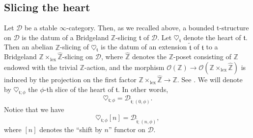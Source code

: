 \documentclass{article}
\theoremstyle{definition}
\newcommand{\Z}{\mathbb{Z}}
\newcommand{\Oo}{\mathcal{O}}
\newcommand{\tee}{\mathfrak{t}}
\begin{document}
\subsection{Slicing the heart}\label{sec:heart}
Let $\mathscr{D}$ be a stable $\infty$-category. Then, as we recalled above, a bounded t-structure on $\mathscr{D}$ is the datum of a Bridgeland $\Z$-slicing $\tee$ of $\mathscr{D}$. Let $\heartsuit_{\mathfrak{t}}$ denote the heart of $\mathfrak{t}$. Then an abelian $\Z$-slicing of $\heartsuit_{\mathfrak{t}}$ is the datum of an extension $\tilde{\tee}$ of $\tee$ to a Bridgeland $\Z\times_{\mathrm{lex}}\hat{\Z}$-slicing on $\mathscr{D}$, where $\hat{\Z}$ denotes the $\Z$-poset consisting of $\Z$ endowed with the trivial $\Z$-action, and the morphism $\Oo(\Z)\to \Oo(\Z\times_{\mathrm{lex}}\hat{\Z})$ is induced by the projection on the first factor $\Z\times_{\mathrm{lex}}\hat{\Z}\to \Z$. See \cite[Section 5]{fosco}. We will denote by $\heartsuit_{\tee;\phi}$ the $\phi$-th slice of the heart of $\tee$. In other words,
\[
\heartsuit_{\tee;\phi}=\mathscr{D}_{\tilde{\tee};(0,\phi)}.
\]
Notice that we have
\[
\heartsuit_{\tee;\phi}[n]=\mathscr{D}_{\tilde{\tee};(n,\phi)},
\]
where $[n]$ denotes the ``shift by $n$'' functor on $\mathscr{D}$.
\end{document}
